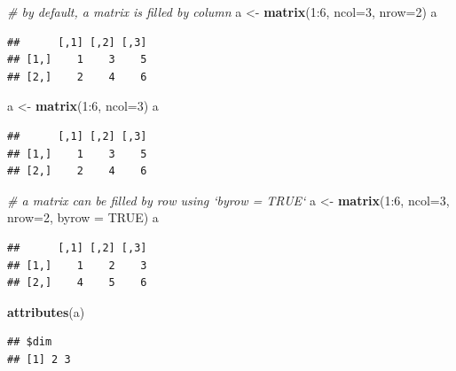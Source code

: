 \documentclass[]{book}
\newenvironment{Shaded}{\begin{snugshade}}{\end{snugshade}}
\newcommand{\KeywordTok}[1]{\textcolor[rgb]{0.13,0.29,0.53}{\textbf{{#1}}}}
\newcommand{\DataTypeTok}[1]{\textcolor[rgb]{0.13,0.29,0.53}{{#1}}}
\newcommand{\DecValTok}[1]{\textcolor[rgb]{0.00,0.00,0.81}{{#1}}}
\newcommand{\StringTok}[1]{\textcolor[rgb]{0.31,0.60,0.02}{{#1}}}
\newcommand{\CommentTok}[1]{\textcolor[rgb]{0.56,0.35,0.01}{\textit{{#1}}}}
\newcommand{\OtherTok}[1]{\textcolor[rgb]{0.56,0.35,0.01}{{#1}}}
\newcommand{\NormalTok}[1]{{#1}}
\begin{document}
\begin{Shaded}
\begin{Highlighting}[]
\CommentTok{# by default, a matrix is filled by column}
\NormalTok{a <-}\StringTok{ }\KeywordTok{matrix}\NormalTok{(}\DecValTok{1}\NormalTok{:}\DecValTok{6}\NormalTok{, }\DataTypeTok{ncol=}\DecValTok{3}\NormalTok{, }\DataTypeTok{nrow=}\DecValTok{2}\NormalTok{)}
\NormalTok{a}
\end{Highlighting}
\end{Shaded}

\begin{verbatim}
##      [,1] [,2] [,3]
## [1,]    1    3    5
## [2,]    2    4    6
\end{verbatim}

\begin{Shaded}
\begin{Highlighting}[]
\NormalTok{a <-}\StringTok{ }\KeywordTok{matrix}\NormalTok{(}\DecValTok{1}\NormalTok{:}\DecValTok{6}\NormalTok{, }\DataTypeTok{ncol=}\DecValTok{3}\NormalTok{)}
\NormalTok{a}
\end{Highlighting}
\end{Shaded}

\begin{verbatim}
##      [,1] [,2] [,3]
## [1,]    1    3    5
## [2,]    2    4    6
\end{verbatim}

\begin{Shaded}
\begin{Highlighting}[]
\CommentTok{# a matrix can be filled by row using `byrow = TRUE`}
\NormalTok{a <-}\StringTok{ }\KeywordTok{matrix}\NormalTok{(}\DecValTok{1}\NormalTok{:}\DecValTok{6}\NormalTok{, }\DataTypeTok{ncol=}\DecValTok{3}\NormalTok{, }\DataTypeTok{nrow=}\DecValTok{2}\NormalTok{, }\DataTypeTok{byrow =} \OtherTok{TRUE}\NormalTok{)}
\NormalTok{a}
\end{Highlighting}
\end{Shaded}

\begin{verbatim}
##      [,1] [,2] [,3]
## [1,]    1    2    3
## [2,]    4    5    6
\end{verbatim}

\begin{Shaded}
\begin{Highlighting}[]
\KeywordTok{attributes}\NormalTok{(a)}
\end{Highlighting}
\end{Shaded}

\begin{verbatim}
## $dim
## [1] 2 3
\end{verbatim}
\end{document}
